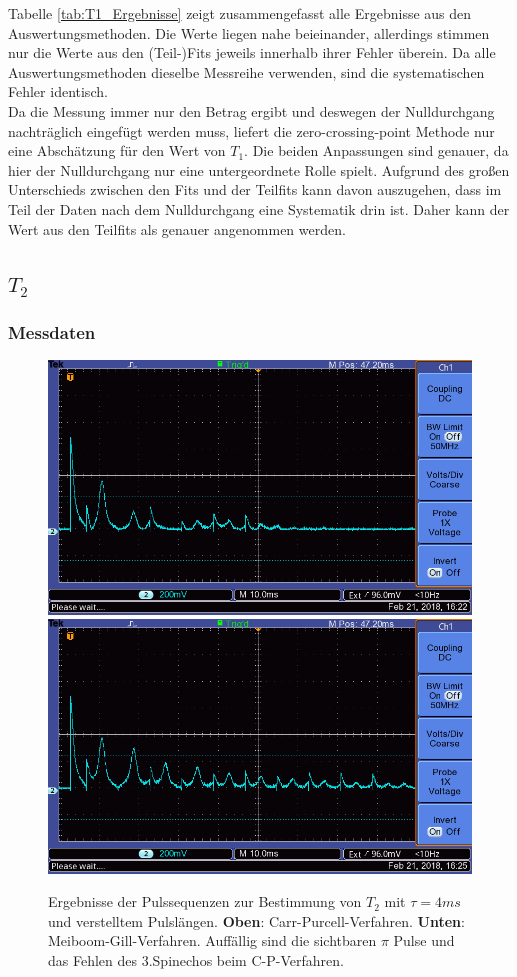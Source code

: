 \documentclass[12pt,a4paper]{article}
\begin{document}
Tabelle \ref{tab:T1_Ergebnisse} zeigt zusammengefasst alle Ergebnisse aus den Auswertungsmethoden. Die Werte liegen nahe beieinander, allerdings stimmen nur die Werte aus den (Teil-)Fits jeweils innerhalb ihrer Fehler überein. Da alle Auswertungsmethoden dieselbe Messreihe verwenden, sind die systematischen Fehler identisch.\\
Da die Messung immer nur den Betrag ergibt und deswegen der Nulldurchgang nachträglich eingefügt werden muss, liefert die zero-crossing-point Methode nur eine Abschätzung für den Wert von $T_1$. Die beiden Anpassungen sind genauer, da hier der Nulldurchgang nur eine untergeordnete Rolle spielt. Aufgrund des großen Unterschieds zwischen den Fits und der Teilfits kann davon auszugehen, dass im Teil der Daten nach dem Nulldurchgang eine Systematik drin ist. Daher kann der Wert aus den Teilfits als genauer angenommen werden.


\subsection{$T_2$}
\subsubsection{Messdaten}\label{sec:T2messdaten}
\begin{figure}
\centering
\includegraphics[scale=0.8]{Bilder/T2CP.png}
\includegraphics[scale=0.8]{Bilder/T2MG.png}
\caption{Ergebnisse der Pulssequenzen zur Bestimmung von $T_2$ mit $\tau = 4ms$ und verstelltem Pulslängen. \textbf{Oben}: Carr-Purcell-Verfahren. \textbf{Unten}: Meiboom-Gill-Verfahren. Auffällig sind die sichtbaren $\pi$ Pulse und das Fehlen des 3.Spinechos beim C-P-Verfahren.}
\label{fig:T2Daten}
\end{figure}
\end{document}

